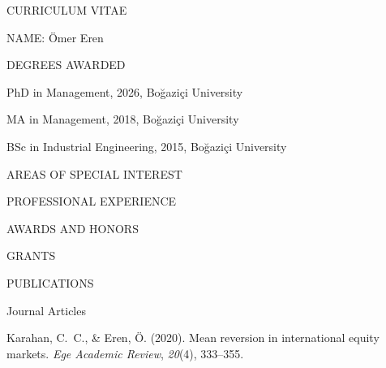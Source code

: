 \documentclass[12pt, oneside]{report}
\begin{document}
\clearpage

\thispagestyle{plain}
\begin{center}
CURRICULUM VITAE
\end{center}

\vspace{12pt}

\noindent NAME: Ömer Eren

\vspace{12pt}

\noindent DEGREES AWARDED

\noindent PhD in Management, 2026, Boğaziçi University

\noindent MA in Management, 2018, Boğaziçi University

\noindent BSc in Industrial Engineering, 2015, Boğaziçi University

\vspace{12pt}

\noindent AREAS OF SPECIAL INTEREST


\vspace{12pt}

\noindent PROFESSIONAL EXPERIENCE


\vspace{12pt}

\noindent AWARDS AND HONORS


\vspace{12pt}

\noindent GRANTS


\vspace{12pt}

\noindent PUBLICATIONS

\vspace{6pt}

\noindent Journal Articles

\noindent Karahan, C.~C., \& Eren, \"{O}. (2020).
        Mean reversion in international equity markets.
        \textit{Ege Academic Review}, \textit{20}(4), 333--355.

\vspace{12pt}
\end{document}
